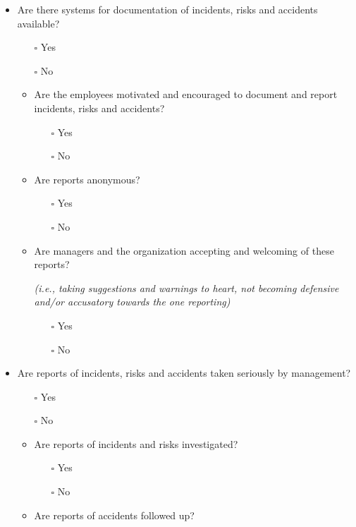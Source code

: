 \documentclass[
  12pt,
]{scrbook}
\providecommand{\tightlist}{%
  \setlength{\itemsep}{0pt}\setlength{\parskip}{0pt}}
\begin{document}
\begin{itemize}
\item
  Are there systems for documentation of incidents, risks and accidents available?

  \begin{itemize}
  \item[$\square$]
    Yes
  \item[$\square$]
    No
  \item
    Are the employees motivated and encouraged to document and report incidents, risks and accidents?

    \begin{itemize}
    \tightlist
    \item[$\square$]
      Yes
    \item[$\square$]
      No
    \end{itemize}
  \item
    Are reports anonymous?

    \begin{itemize}
    \tightlist
    \item[$\square$]
      Yes
    \item[$\square$]
      No
    \end{itemize}
  \item
    Are managers and the organization accepting and welcoming of these reports?

    \emph{(i.e., taking suggestions and warnings to heart, not becoming defensive and/or accusatory towards the one reporting)}

    \begin{itemize}
    \tightlist
    \item[$\square$]
      Yes
    \item[$\square$]
      No
    \end{itemize}
  \end{itemize}
\item
  Are reports of incidents, risks and accidents taken seriously by management?

  \begin{itemize}
  \item[$\square$]
    Yes
  \item[$\square$]
    No
  \item
    Are reports of incidents and risks investigated?

    \begin{itemize}
    \tightlist
    \item[$\square$]
      Yes
    \item[$\square$]
      No
    \end{itemize}
  \item
    Are reports of accidents followed up?


\end{itemize}
\end{itemize}
\end{document}
